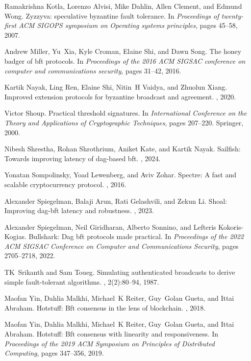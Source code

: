 \begin{thebibliography}{10}
Ramakrishna Kotla, Lorenzo Alvisi, Mike Dahlin, Allen Clement, and Edmund Wong.
\newblock Zyzzyva: speculative byzantine fault tolerance.
\newblock In {\em Proceedings of twenty-first ACM SIGOPS symposium on Operating
  systems principles}, pages 45--58, 2007.

Andrew Miller, Yu~Xia, Kyle Croman, Elaine Shi, and Dawn Song.
\newblock The honey badger of bft protocols.
\newblock In {\em Proceedings of the 2016 ACM SIGSAC conference on computer and
  communications security}, pages 31--42, 2016.

Kartik Nayak, Ling Ren, Elaine Shi, Nitin~H Vaidya, and Zhuolun Xiang.
\newblock Improved extension protocols for byzantine broadcast and agreement.
, 2020.

Victor Shoup.
\newblock Practical threshold signatures.
\newblock In {\em International Conference on the Theory and Applications of
  Cryptographic Techniques}, pages 207--220. Springer, 2000.

Nibesh Shrestha, Rohan Shrothrium, Aniket Kate, and Kartik Nayak.
\newblock Sailfish: Towards improving latency of dag-based bft.
, 2024.

Yonatan Sompolinsky, Yoad Lewenberg, and Aviv Zohar.
\newblock Spectre: A fast and scalable cryptocurrency protocol.
, 2016.

Alexander Spiegelman, Balaji Arun, Rati Gelashvili, and Zekun Li.
\newblock Shoal: Improving dag-bft latency and robustness.
, 2023.

Alexander Spiegelman, Neil Giridharan, Alberto Sonnino, and Lefteris
  Kokoris-Kogias.
\newblock Bullshark: Dag bft protocols made practical.
\newblock In {\em Proceedings of the 2022 ACM SIGSAC Conference on Computer and
  Communications Security}, pages 2705--2718, 2022.

TK~Srikanth and Sam Toueg.
\newblock Simulating authenticated broadcasts to derive simple fault-tolerant
  algorithms.
, 2(2):80--94, 1987.

Maofan Yin, Dahlia Malkhi, Michael~K Reiter, Guy~Golan Gueta, and Ittai
  Abraham.
\newblock Hotstuff: Bft consensus in the lens of blockchain.
, 2018.

Maofan Yin, Dahlia Malkhi, Michael~K Reiter, Guy~Golan Gueta, and Ittai
  Abraham.
\newblock Hotstuff: Bft consensus with linearity and responsiveness.
\newblock In {\em Proceedings of the 2019 ACM Symposium on Principles of
  Distributed Computing}, pages 347--356, 2019.

\end{thebibliography}




